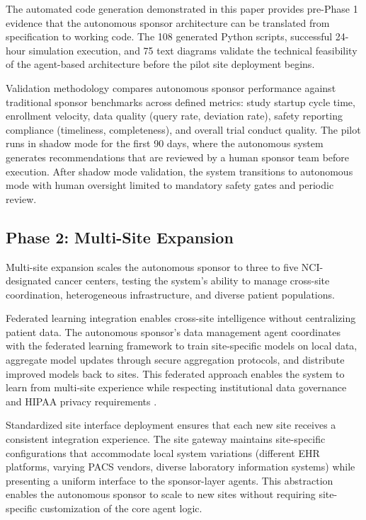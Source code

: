 The automated code generation demonstrated in this paper provides pre-Phase 1 evidence that
the autonomous sponsor architecture can be translated from specification to working code.
The 108 generated Python scripts, successful 24-hour simulation execution, and 75 text
diagrams validate the technical feasibility of the agent-based architecture before the
pilot site deployment begins.

Validation methodology compares autonomous sponsor performance against traditional sponsor
benchmarks across defined metrics: study startup cycle time, enrollment velocity, data
quality (query rate, deviation rate), safety reporting compliance (timeliness, completeness),
and overall trial conduct quality. The pilot runs in shadow mode for the first 90 days,
where the autonomous system generates recommendations that are reviewed by a human sponsor
team before execution. After shadow mode validation, the system transitions to autonomous
mode with human oversight limited to mandatory safety gates and periodic review.

\subsection{Phase 2: Multi-Site Expansion}

Multi-site expansion scales the autonomous sponsor to three to five NCI-designated cancer
centers, testing the system's ability to manage cross-site coordination, heterogeneous
infrastructure, and diverse patient populations.

Federated learning integration enables cross-site intelligence without centralizing
patient data. The autonomous sponsor's data management agent coordinates with the
federated learning framework to train site-specific models on local data, aggregate model
updates through secure aggregation protocols, and distribute improved models back to
sites. This federated approach enables the system to learn from multi-site experience
while respecting institutional data governance and HIPAA privacy requirements \cite{hipaa}.

Standardized site interface deployment ensures that each new site receives a consistent
integration experience. The site gateway maintains site-specific configurations that
accommodate local system variations (different EHR platforms, varying PACS vendors,
diverse laboratory information systems) while presenting a uniform interface to the
sponsor-layer agents. This abstraction enables the autonomous sponsor to scale to new
sites without requiring site-specific customization of the core agent logic.

